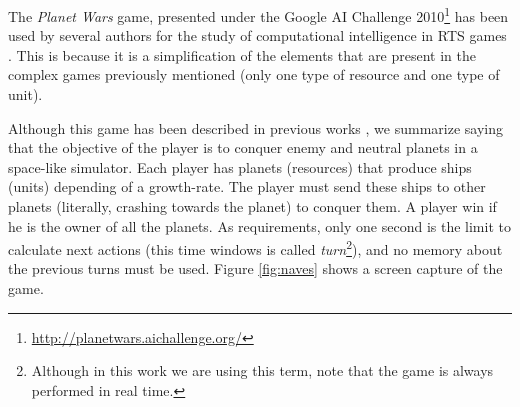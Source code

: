 The {\em Planet Wars} game, presented under the Google AI Challenge 2010\footnote{\url{http://planetwars.aichallenge.org/}} has been used by several authors for the study of computational intelligence in RTS games
\cite{Lara2013mapgenerator,Mora2012Genebot,FernandezAres2012adaptive}. This
is because it is a simplification of the elements that are present in
the complex games previously mentioned (only one type of resource and
one type of unit). %


 Although this game has been described in previous works
 \cite{Lara2013mapgenerator,Mora2012Genebot,FernandezAres2012adaptive},
we summarize saying that the objective of the player is to conquer
enemy and neutral planets in a space-like simulator. Each player has
planets (resources) that produce ships (units) depending of a
growth-rate. The player must send these ships to other planets
(literally, crashing towards the planet) to conquer them. A player win
if he is the owner of all the planets. As requirements, only one
second is the limit to calculate next actions (this time windows is
called {\em turn}\footnote{Although in this work we are using this
  term, note that the game is always performed in real time.}), and no
memory about the previous turns must be used.  Figure \ref{fig:naves}
shows a screen capture of the game. %

